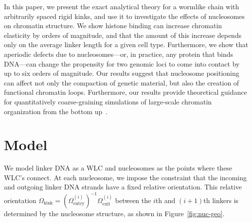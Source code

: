 \documentclass[%
 reprint,
superscriptaddress,
showpacs,preprintnumbers,
 amsmath,amssymb,
 aps,
 prl,
]{revtex4-1}
\begin{document}
In this paper, we present the exact analytical theory for a wormlike chain
    with arbitrarily spaced rigid kinks, and use it to investigate the effects
    of nucleosomes on chromatin structure.
We show histone binding can increase chromatin elasticity by orders of
    magnitude, and that the amount of this increase depends only on the average
    linker length for a given cell type.
Furthermore, we show that aperiodic defects due to nucleosomes---or, in
    practice, any protein that binds DNA---can change the
    propensity for two genomic loci to come into contact by up to six
    orders of magnitude.
Our results suggest that nucleosome positioning can affect not only
    the compaction of genetic material, but also the creation of
    functional chromatin loops. %
Furthermore, our results provide theoretical guidance for quantitatively
    coarse-graining simulations of large-scale chromatin organization from the
    bottom up~\cite{macphersonInPress}.

\section{\label{sec:model}Model}
We model linker DNA as a WLC and nucleosomes as the points where these
    WLC's connect.
At each nucleosome, we impose the constraint that the incoming and outgoing
    linker DNA strands have a fixed relative orientation. This relative
    orientation $\Omega_\text{kink}  = {(\Omega^{(i)}_\text{entry})}^{-1}
    \Omega^{(i)}_\text{exit}$ between the $i$th and $(i+1)$th linkers is
    determined by the nucleosome structure, as shown in
    Figure~\ref{fig:nuc-geo}.
\end{document}
